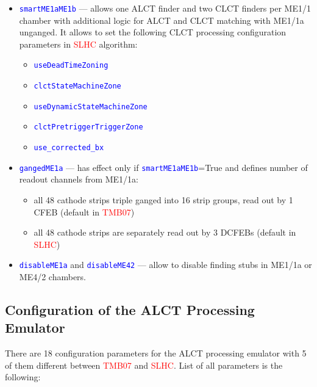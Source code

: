 \begin{itemize}
\item \textcolor{blue}{\texttt{smartME1aME1b}} --- allows one ALCT finder and two CLCT finders per ME1/1 chamber with additional logic for ALCT and CLCT matching with ME1/1a unganged. It allows to set the following CLCT processing configuration parameters in \textcolor{red}{SLHC} algorithm:
  \begin{itemize}
  \item \textcolor{blue}{\texttt{useDeadTimeZoning}}
  \item \textcolor{blue}{\texttt{clctStateMachineZone}}
  \item \textcolor{blue}{\texttt{useDynamicStateMachineZone}}
  \item \textcolor{blue}{\texttt{clctPretriggerTriggerZone}}
  \item \textcolor{blue}{\texttt{use\_corrected\_bx}}
  \end{itemize}
\item \textcolor{blue}{\texttt{gangedME1a}} --- has effect only if \textcolor{blue}{\texttt{smartME1aME1b}}=True and defines number of readout channels from ME1/1a:
  \begin{itemize}
  \item all 48 cathode strips triple ganged into 16 strip groups, read out by 1 CFEB (default in \textcolor{red}{TMB07})
  \item all 48 cathode strips are separately read out by 3 DCFEBs (default in \textcolor{red}{SLHC})
  \end{itemize}
\item \textcolor{blue}{\texttt{disableME1a}} and \textcolor{blue}{\texttt{disableME42}} --- allow to disable finding stubs in ME1/1a or ME4/2 chambers.
\end{itemize}

\subsection{Configuration of the ALCT Processing Emulator}
\label{sec:ALCT_conf}

There are 18 configuration parameters for the ALCT processing emulator with 5 of them different between \textcolor{red}{TMB07} and \textcolor{red}{SLHC}. List of all parameters is the following:

